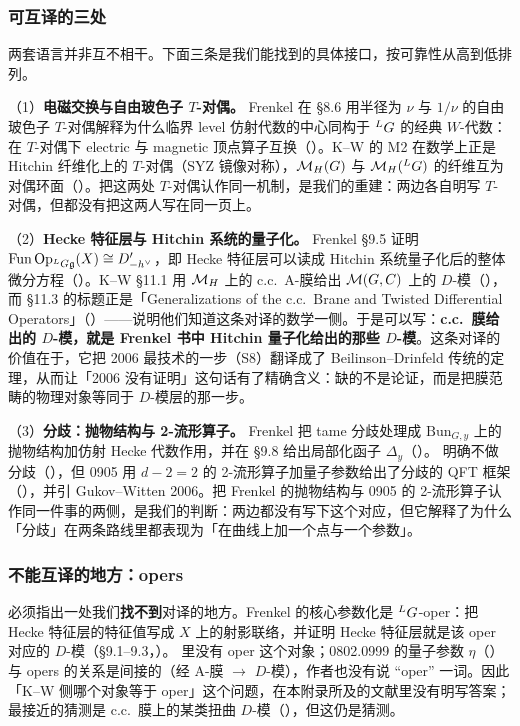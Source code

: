 \subsubsection*{可互译的三处}

两套语言并非互不相干。下面三条是我们能找到的具体接口，按可靠性从高到低排列。

（1）\textbf{电磁交换与自由玻色子 $T$-对偶。} Frenkel 在 \S8.6 用半径为 $\nu$ 与 $1/\nu$ 的自由玻色子 $T$-对偶解释为什么临界 level 仿射代数的中心同构于 ${}^{L}G$ 的经典 $W$-代数：在 $T$-对偶下 electric 与 magnetic 顶点算子互换（）。\pA K--W 的 M2 在数学上正是 Hitchin 纤维化上的 $T$-对偶（SYZ 镜像对称），$\mathcal{M}_H(G)$ 与 $\mathcal{M}_H({}^{L}G)$ 的纤维互为对偶环面（）。\pA 把这两处 $T$-对偶认作同一机制，是我们的重建：两边各自明写 $T$-对偶，但都没有把这两人写在同一页上。\pB

（2）\textbf{Hecke 特征层与 Hitchin 系统的量子化。} Frenkel \S9.5 证明 $\mathrm{Fun}\,\mathrm{Op}_{{}^{L}G\mathfrak{g}}(X)\cong D'_{-h^\vee}$，即 Hecke 特征层可以读成 Hitchin 系统量子化后的整体微分方程（）。\pA K--W \S11.1 用 $\mathcal{M}_H$ 上的 c.c.\ A-膜给出 $\mathcal{M}(G,C)$ 上的 $D$-模（），而 \S11.3 的标题正是「Generalizations of the c.c.\ Brane and Twisted Differential Operators」（）——说明他们知道这条对译的数学一侧。\pA 于是可以写：\textbf{c.c.\ 膜给出的 $D$-模，就是 Frenkel 书中 Hitchin 量子化给出的那些 $D$-模}。\pB 这条对译的价值在于，它把 2006 最技术的一步（S8）翻译成了 Beilinson--Drinfeld 传统的定理，从而让「2006 没有证明」这句话有了精确含义：缺的不是论证，而是把膜范畴的物理对象等同于 $D$-模层的那一步。\pC

（3）\textbf{分歧：抛物结构与 2-流形算子。} Frenkel 把 tame 分歧处理成 $\mathrm{Bun}_{G,y}$ 上的抛物结构加仿射 Hecke 代数作用，并在 \S9.8 给出局部化函子 $\Delta_y$（）。 明确不做分歧（），但 0905 用 $d-2=2$ 的 2-流形算子加量子参数给出了分歧的 QFT 框架（），并引 Gukov--Witten 2006。\pA 把 Frenkel 的抛物结构与 0905 的 2-流形算子认作同一件事的两侧，是我们的判断：两边都没有写下这个对应，但它解释了为什么「分歧」在两条路线里都表现为「在曲线上加一个点与一个参数」。\pC

\subsubsection*{不能互译的地方：opers}

必须指出一处我们\textbf{找不到}对译的地方。Frenkel 的核心参数化是 ${}^{L}G$-oper：把 Hecke 特征层的特征值写成 $X$ 上的射影联络，并证明 Hecke 特征层就是该 oper 对应的 $D$-模（\S9.1--9.3，）。 里没有 oper 这个对象；0802.0999 的量子参数 $\eta$（）与 opers 的关系是间接的（经 A-膜 $\to$ $D$-模），作者也没有说 ``oper'' 一词。\pA 因此「K--W 侧哪个对象等于 oper」这个问题，在本附录所及的文献里没有明写答案；最接近的猜测是 c.c.\ 膜上的某类扭曲 $D$-模（），但这仍是猜测。\pC

